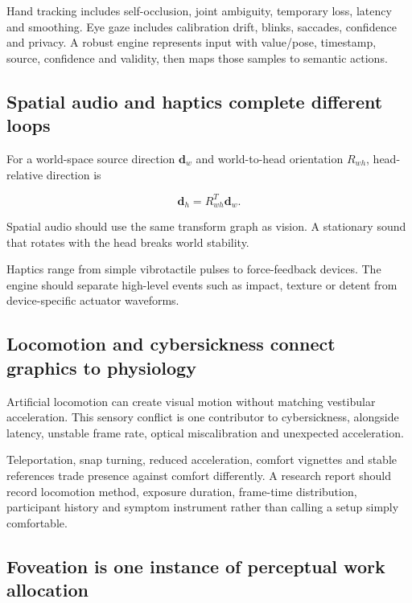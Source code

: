 Hand tracking includes self-occlusion, joint ambiguity, temporary loss, latency and smoothing. Eye gaze includes calibration drift, blinks, saccades, confidence and privacy. A robust engine represents input with value/pose, timestamp, source, confidence and validity, then maps those samples to semantic actions.

\subsection{Spatial audio and haptics complete different loops}\label{04-visual-computing-ii-ch035-spatial-audio-and-haptics-complete-different-loops}

For a world-space source direction \(\mathbf d_w\) and world-to-head orientation \(R_{wh}\), head-relative direction is

\[
\mathbf d_h=R_{wh}^{T}\mathbf d_w.
\]

Spatial audio should use the same transform graph as vision. A stationary sound that rotates with the head breaks world stability.

Haptics range from simple vibrotactile pulses to force-feedback devices. The engine should separate high-level events such as impact, texture or detent from device-specific actuator waveforms.

\subsection{Locomotion and cybersickness connect graphics to physiology}\label{04-visual-computing-ii-ch035-locomotion-and-cybersickness-connect-graphics-to-physiology}

Artificial locomotion can create visual motion without matching vestibular acceleration. This sensory conflict is one contributor to cybersickness, alongside latency, unstable frame rate, optical miscalibration and unexpected acceleration.

Teleportation, snap turning, reduced acceleration, comfort vignettes and stable references trade presence against comfort differently. A research report should record locomotion method, exposure duration, frame-time distribution, participant history and symptom instrument rather than calling a setup simply comfortable.

\subsection{Foveation is one instance of perceptual work allocation}\label{04-visual-computing-ii-ch035-foveation-is-one-instance-of-perceptual-work-allocation}

